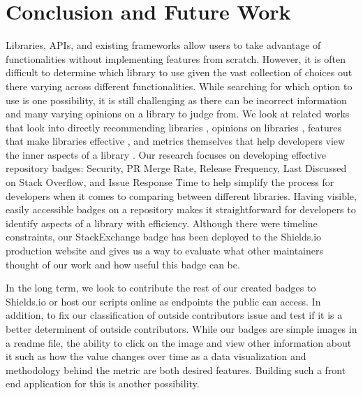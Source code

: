 \documentclass[12pt, letterpaper]{article}
\begin{document}
\section{Conclusion and Future Work}
Libraries, APIs, and existing frameworks allow users to take advantage of functionalities without implementing
features from scratch. However, it is often difficult to determine which library to use given the vast
collection of choices out there varying across different functionalities. 
While searching for which option to use is one possibility, it is still challenging as there can
be incorrect information and many varying opinions on a library to judge from.
We look at related works that look into directly recommending libraries \cite{analogical},
opinions on libraries \cite{opiner}, features that make libraries effective \cite{githubbadges, librarytrends, transparency}
, and metrics themselves that help developers view the inner aspects of a library 
\cite{githubbadges, librarytrends, empiricalmetrics, metrics,transparency,shopifyarticle, apiwave}.
Our research focuses on developing effective repository badges: Security, PR Merge Rate, Release Frequency, Last Discussed on Stack Overflow, and
Issue Response Time to help simplify the process for developers when it comes to comparing between different libraries. 
Having visible, easily accessible badges on a repository makes it straightforward for developers to identify 
aspects of a library with efficiency.
Although there were timeline constraints, our StackExchange badge has been deployed to the Shields.io production website \cite{shields}
and gives us a way to evaluate what other maintainers thought of our work and how useful this badge can be.


In the long term, we look to contribute the rest of our created badges to Shields.io or host our scripts online
as endpoints the public can access. In addition, to fix our classification of outside contributors issue and 
test if it is a better determinent of outside contributors. 
While our badges are simple images in a readme file, the ability to click on the image and view other information
about it such as how the value changes over time as a data visualization
and methodology behind the metric are both desired features. 
Building such a front end application for this is another possibility. 

\newpage


\end{document}
